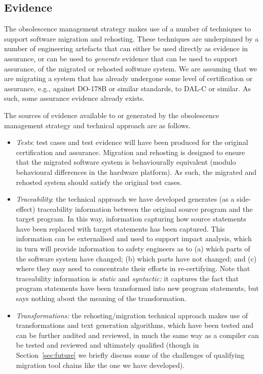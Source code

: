 \documentclass{llncs}
\begin{document}
\subsection{Evidence}
The obsolescence management strategy makes use of a number of techniques to support software migration and rehosting.
These techniques are underpinned by a number of engineering artefacts that can either be used directly as evidence in assurance, or
can be used to \textit{generate} evidence that can be used to support assurance, of the migrated or rehosted software system. 
We are assuming that we are migrating a system that has already undergone some level of certification or assurance,
e.g., against DO-178B or similar standards, to DAL-C or similar. As such, some assurance evidence already exists.

The sources of evidence available to or generated by the obsolescence management strategy and technical approach are as follows.

\begin{itemize}
\item \textit{Tests}: test cases and test evidence will have been produced for the original certification and assurance. Migration and rehosting
is designed to ensure that the migrated software system is behaviourally equivalent (modulo behavioural differences in the hardware platform).
As such, the migrated and rehosted system should satisfy the original test cases.

\item \textit{Traceability}: the technical approach we have developed generates (as a side-effect) traceability information between the original
source program and the target program. In this way, information capturing how source statements have been replaced with target statements has
been captured. This information can be externalised and used to support impact analysis, which in turn will provide information to safety engineers as
to (a) which parts of the software system have changed; (b) which parts have not changed; and (c) where they may need to concentrate their efforts
in re-certifying. Note that traceability information is \textit{static} and \textit{syntactic:} it captures the fact that program statements have been 
transformed into new program statements, but says nothing about the meaning of the transformation.

\item \textit{Transformations:} the rehosting/migration technical approach makes use of transformations and text generation algorithms, which have
been tested and can be further audited and reviewed, in much the same way as a compiler can be tested and reviewed and ultimately qualified (though in Section~\ref{sec:future}
we briefly discuss some of the challenges of qualifying migration tool chains like the one we have developed).
\end{itemize}
\end{document}
